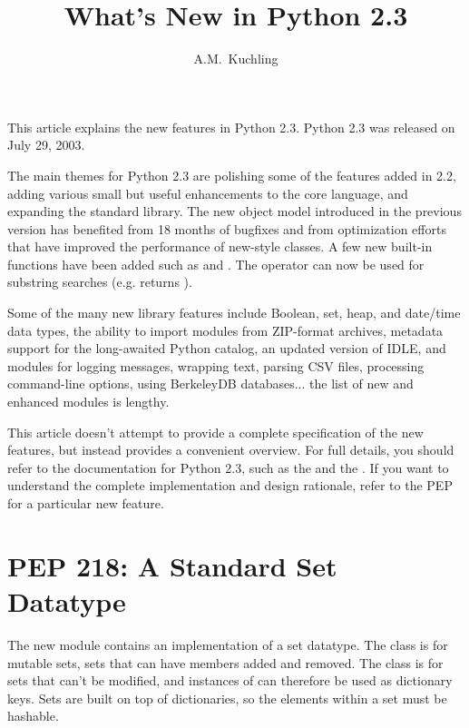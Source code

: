 \documentclass{howto}
\title{What's New in Python 2.3}
\author{A.M.\ Kuchling}
\begin{document}
\maketitle
\tableofcontents

This article explains the new features in Python 2.3.  Python 2.3 was
released on July 29, 2003.

The main themes for Python 2.3 are polishing some of the features
added in 2.2, adding various small but useful enhancements to the core
language, and expanding the standard library.  The new object model
introduced in the previous version has benefited from 18 months of
bugfixes and from optimization efforts that have improved the
performance of new-style classes.  A few new built-in functions have
been added such as  and .  The
 operator can now be used for substring searches (e.g.
 returns ).

Some of the many new library features include Boolean, set, heap, and
date/time data types, the ability to import modules from ZIP-format
archives, metadata support for the long-awaited Python catalog, an
updated version of IDLE, and modules for logging messages, wrapping
text, parsing CSV files, processing command-line options, using BerkeleyDB
databases...  the list of new and enhanced modules is lengthy.

This article doesn't attempt to provide a complete specification of
the new features, but instead provides a convenient overview.  For
full details, you should refer to the documentation for Python 2.3,
such as the  and
the .  If you want
to understand the complete implementation and design rationale, 
refer to the PEP for a particular new feature.


\section{PEP 218: A Standard Set Datatype}

The new  module contains an implementation of a set
datatype.  The  class is for mutable sets, sets that can
have members added and removed.  The  class is for
sets that can't be modified, and instances of  can
therefore be used as dictionary keys.  Sets are built on top of
dictionaries, so the elements within a set must be hashable.
\end{document}
